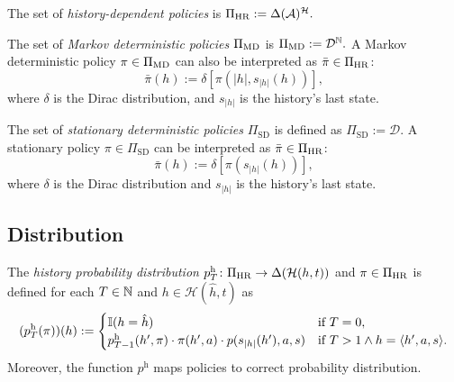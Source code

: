 \begin{definition} \label{def:policy-hr}
The set of \emph{history-dependent policies} is \(\Pi_{\mathrm{HR}} :=  \Delta(\mathcal{A})^{\mathcal{H}}. \)
\end{definition}


\begin{definition} \label{def:policy-md}
The set of \emph{Markov deterministic policies} $\Pi_{\mathrm{MD}}$ is \(\Pi_{\mathrm{MD}} :=  \mathcal{D}^{\mathbb{N}}. \)
A Markov deterministic policy $\pi \in \Pi_{\mathrm{MD}}$ can also be interpreted as $\bar{\pi} \in \Pi_{\mathrm{HR}}$:
\[
  \bar{\pi}(h) := \delta \left[  \pi(|h|, s_{|h|}(h)) \right],
\]
where $\delta$ is the Dirac distribution,  and $s_{|h|}$ is the history's last state.
\end{definition}

\begin{definition} \label{def:policy-sd}
The set of \emph{stationary deterministic policies} $\Pi_{\mathrm{SD}}$ is defined as \(\Pi_{\mathrm{SD}} := \mathcal{D}. \)
A stationary policy $\pi \in \Pi_{\mathrm{SD}}$ can be interpreted as $\bar{\pi} \in \Pi_{\mathrm{HR}}$:
\[
  \bar{\pi}(h) := \delta \left[  \pi(s_{|h|}(h)) \right],
\]
where $\delta$ is the Dirac distribution and $s_{|h|}$ is the history's last state.
\end{definition}

\subsection{Distribution}


\begin{definition}\label{def:hist-dist}
The \emph{history probability distribution} $p^{\mathrm{h}}_T \colon  \Pi_{\mathrm{HR}} \to \Delta(\mathcal{H}(h,t))$  and $\pi \in \Pi_{\mathrm{HR}}$ is defined for each $T \in \mathbb{N}$ and $h\in \mathcal{H}(\hat{h},t)$ as
\[
(p^{\mathrm{h}}_T(\pi))(h) :=
\begin{cases}
\mathbb{I}(h = \hat{h}) &\text{if } T = 0, \\
p_{T-1}^{\mathrm{h}}(h', \pi) \cdot \pi(h',a) \cdot  p(s_{|h|}(h'), a , s) &\text{if } T > 1 \wedge h = \langle h', a, s \rangle.
\end{cases}
\]
Moreover, the function $p^{\mathrm{h}}$ maps policies to correct probability distribution.
\end{definition}

